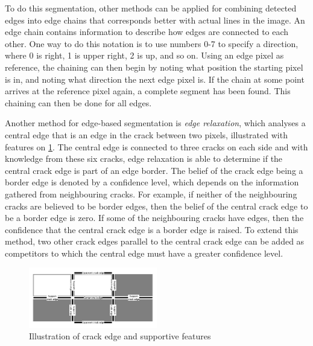 To do this segmentation, other methods can be applied for combining detected edges into edge chains that corresponds better with actual lines in the image. An edge chain contains information to describe how edges are connected to each other. One way to do this notation is to use numbers 0-7 to specify a direction, where 0 is right, 1 is upper right, 2 is up, and so on.
Using an edge pixel as reference, the chaining can then begin by noting what position the starting pixel is in, and noting what direction the next edge pixel is. If the chain at some point arrives at the reference pixel again, a complete segment has been found. This chaining can then be done for all edges.

Another method for edge-based segmentation is \textit{edge relaxation}, which analyses a central edge that is an edge in the crack between two pixels, illustrated with features on \cref{fig:crack_edge}. The central edge is connected to three cracks on each side and with knowledge from these six cracks, edge relaxation is able to determine if the central crack edge is part of an edge border.
The belief of the crack edge being a border edge is denoted by a confidence level, which depends on the information gathered from neighbouring cracks. For example, if neither of the neighbouring cracks are believed to be border edges, then the belief of the central crack edge to be a border edge is zero. If some of the neighbouring cracks have edges, then the confidence that the central crack edge is a border edge is raised. To extend this method, two other crack edges parallel to the central crack edge can be added as competitors to which the central edge must have a greater confidence level.

\begin{figure}[H]
	\centering
	\includegraphics[width=0.5\textwidth]{graphics/crack_edges.pdf}
	\caption{Illustration of crack edge and supportive features}
	\label{fig:crack_edge}
\end{figure}

